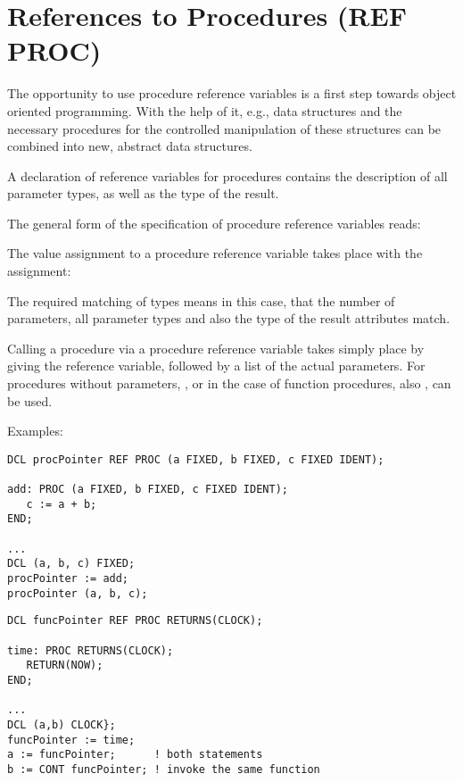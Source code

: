 \section{References to Procedures (REF PROC)}  %
\label{sec_ref_proc}

The opportunity to use procedure reference variables is a first step
towards object oriented programming. With the help of it, e.g., data
structures and the necessary procedures for the controlled manipulation of
these structures can be combined into new, abstract data structures.

A declaration of reference variables for procedures contains the
description of all parameter types, as well as the type of the result.

\begin{grammarframe}

 
\end{grammarframe}

The general form of the specification of procedure reference variables
reads:

\begin{grammarframe}
 
\end{grammarframe}

The value assignment to a procedure reference variable takes place with
the assignment:

\begin{grammarframe}

\end{grammarframe}


The required matching of types means in this case, that the number of
parameters, all parameter types and also the type of the result
attributes match.

Calling a procedure via a procedure reference variable takes simply
place by giving the reference variable, followed by a list of the actual
parameters. For procedures without parameters, , or in the case of
function procedures, also , can be used.

Examples:
\begin{lstlisting}
DCL procPointer REF PROC (a FIXED, b FIXED, c FIXED IDENT);

add: PROC (a FIXED, b FIXED, c FIXED IDENT);
   c := a + b;
END;

...
DCL (a, b, c) FIXED;
procPointer := add;
procPointer (a, b, c);
\end{lstlisting}

\begin{lstlisting}
DCL funcPointer REF PROC RETURNS(CLOCK);

time: PROC RETURNS(CLOCK);
   RETURN(NOW);
END;

...
DCL (a,b) CLOCK};
funcPointer := time;
a := funcPointer;      ! both statements
b := CONT funcPointer; ! invoke the same function
\end{lstlisting}

